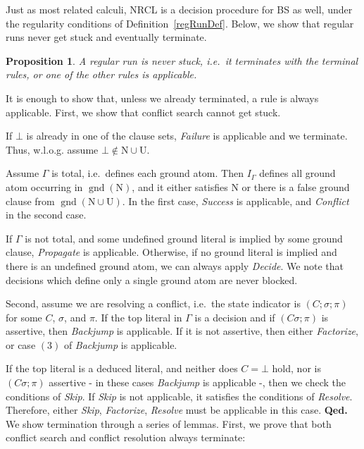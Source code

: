 \documentclass[a4paper]{article}
\newcommand{\mGnd}{\operatorname{gnd}} \newcommand{\mLVar}{\operatorname{lvar}} \newcommand{\mRVar}{\operatorname{rvar}} \newcommand{\mDmn}{\operatorname{dom}} \newcommand{\mRng}{\operatorname{rng}} \newcommand{\mMGU}{\operatorname{mgu}} \newcommand{\mDef}{\operatorname{def}} \newcommand{\mDomain}{\mathcal{D}} \newcommand{\mVar}{\operatorname{var}}
\newcommand{\mEPRs}{BS}
\newcommand{\startproof}{{\bf Proof:~}}
\newcommand{\finishproof}{{\bf Qed.}}
\newcommand{\leaveabit}{\\[6 pt]}
\newtheorem{prop}[defi]{Proposition}
\begin{document}
Just as most related calculi, NRCL is a decision procedure for {\mEPRs} as well, under the regularity conditions of Definition~\ref{regRunDef}.
Below, we show that regular runs never get stuck and eventually terminate.

\begin{prop}\label{noStuckProp}
A regular run is never stuck,  i.e.\ 
it terminates with the terminal rules, or one of the other rules is applicable.
\end{prop}
\noindent\startproof
It is enough to show that, unless we already terminated, a rule is always applicable. First, we show that conflict search cannot get stuck.

If $\bot$ is already in one of the clause sets, \emph{Failure} is applicable and we terminate. Thus, w.l.o.g. assume $\bot \notin \text{N}\cup\text{U}$.

Assume $\Gamma$ is total, i.e.\ 
defines each ground atom. Then $I_{\Gamma}$ defines all ground atom occurring in $\mGnd(\text{N})$,
 and it either satisfies $\text{N}$ or there is a 
false ground clause from $\mGnd(\text{N}\cup\text{U})$. 
In the first case, \emph{Success} is applicable, and \emph{Conflict} in the second case.

If $\Gamma$ is not total, and some undefined ground literal is implied by some ground clause, \emph{Propagate} is applicable. Otherwise, 
if no ground literal is implied and there is an undefined ground atom, we can always apply \emph{Decide}. 
We note that decisions which define only a single ground atom are never blocked.

Second, assume we are resolving a conflict, i.e.\ 
the state indicator is $(C; \sigma; \pi)$ for some $C$, $\sigma$, and $\pi$. 
If the top literal in $\Gamma$ is a decision and if $(C\sigma; \pi)$ is assertive, then \emph{Backjump} is applicable.
If it is not assertive, then either \emph{Factorize}, or case $(3)$ of \emph{Backjump} is applicable.

If the top literal is a deduced literal, 
and neither does $C = \bot$ hold, nor is $(C\sigma; \pi)$ assertive - in these cases \emph{Backjump} is applicable -, 
then we check the conditions of \emph{Skip}.
If \emph{Skip} is not applicable, it satisfies the conditions of \emph{Resolve}. 
Therefore, either \emph{Skip}, \emph{Factorize}, \emph{Resolve} must be applicable in this case.
\finishproof\leaveabit
\noindent
We show termination through a series of lemmas. First, we prove that both conflict search and conflict resolution always terminate:
\end{document}
